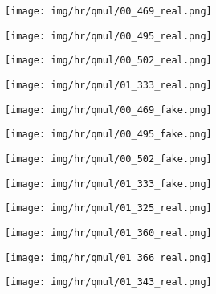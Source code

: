 \documentclass[10pt,twocolumn,letterpaper]{article}
\begin{document}
\newcommand{\hrwidth}{0.20} 
\begin{figure*}[tbp]
\captionsetup[subfigure]{labelformat=empty}
\begin{center}
\begin{subfigure}[b]{\hrwidth\linewidth}
  \texttt{[image: img/hr/qmul/00\_469\_real.png]}
  \end{subfigure}
  \begin{subfigure}[b]{\hrwidth\linewidth}
  \texttt{[image: img/hr/qmul/00\_495\_real.png]}
  \end{subfigure}
\begin{subfigure}[b]{\hrwidth\linewidth}
  \texttt{[image: img/hr/qmul/00\_502\_real.png]}
  \end{subfigure}
  \begin{subfigure}[b]{\hrwidth\linewidth}
  \texttt{[image: img/hr/qmul/01\_333\_real.png]}
  \end{subfigure}

\begin{subfigure}[b]{\hrwidth\linewidth}
  \texttt{[image: img/hr/qmul/00\_469\_fake.png]}
  \end{subfigure}
  \begin{subfigure}[b]{\hrwidth\linewidth}
  \texttt{[image: img/hr/qmul/00\_495\_fake.png]}
  \end{subfigure}
\begin{subfigure}[b]{\hrwidth\linewidth}
  \texttt{[image: img/hr/qmul/00\_502\_fake.png]}
  \end{subfigure}
  \begin{subfigure}[b]{\hrwidth\linewidth}
  \texttt{[image: img/hr/qmul/01\_333\_fake.png]}
  \end{subfigure}


\begin{subfigure}[b]{\hrwidth\linewidth}
  \texttt{[image: img/hr/qmul/01\_325\_real.png]}
  \end{subfigure}
  \begin{subfigure}[b]{\hrwidth\linewidth}
  \texttt{[image: img/hr/qmul/01\_360\_real.png]}
  \end{subfigure}
\begin{subfigure}[b]{\hrwidth\linewidth}
  \texttt{[image: img/hr/qmul/01\_366\_real.png]}
  \end{subfigure}
  \begin{subfigure}[b]{\hrwidth\linewidth}
  \texttt{[image: img/hr/qmul/01\_343\_real.png]}
  \end{subfigure} 


\end{center}
\end{figure*}
\end{document}
